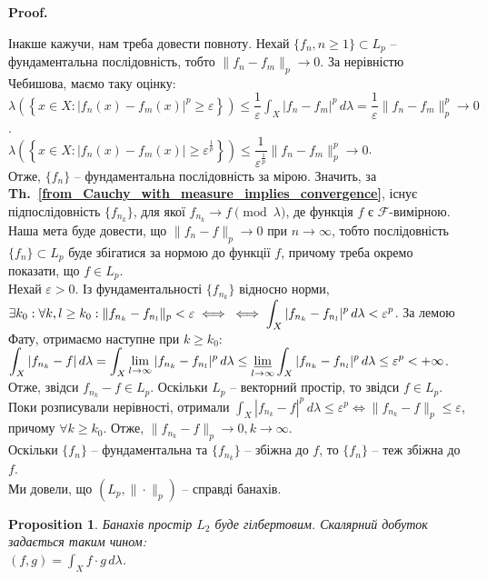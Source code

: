 \documentclass[a4paper, 10pt]{article}
\makeatletter
\theoremstyle{theoremdd}
\newtheorem{proposition}[theorem]{Proposition}
\newcommand\thref[1]{\textbf{Th.~\ref{#1}}}
\renewenvironment{proof}[1][Proof.\\]{\par
\pushQED{\hfill \qed}%
\normalfont \topsep6\p@\@plus6\p@\relax
\trivlist
\item\relax
{\bfseries
#1\@addpunct{.}}\hspace\labelsep\ignorespaces
}{%
\popQED\endtrivlist\@endpefalse
}
\makeatother
\begin{document}
\begin{proof}
Інакше кажучи, нам треба довести повноту. Нехай $\{f_n, n \geq 1\} \subset L_p$ -- фундаментальна послідовність, тобто $\|f_n - f_m\|_p \to 0$. За нерівністю Чебишова, маємо таку оцінку:\\
$\displaystyle\lambda\left(\left\{ x \in X: |f_n(x) - f_m(x)|^p \geq \varepsilon \right\}\right) \leq \dfrac{1}{\varepsilon} \int_X |f_n - f_m|^p\,d\lambda = \dfrac{1}{\varepsilon} \|f_n - f_m\|_p^p \to 0$.\\
$\displaystyle\lambda\left(\left\{ x \in X: |f_n(x) - f_m(x)| \geq \varepsilon^{\frac{1}{p}} \right\}\right) \leq \dfrac{1}{\varepsilon^{\frac{1}{p}}} \|f_n - f_m\|^p_p \to 0$.\\
Отже, $\{f_n\}$ -- фундаментальна послідовність за мірою. Значить, за \thref{from_Cauchy_with_measure_implies_convergence}, існує підпослідовність $\{f_{n_k}\}$, для якої $f_{n_k} \to f \pmod \lambda$, де функція $f$ є $\mathcal{F}$-вимірною. Наша мета буде довести, що $\|f_n - f\|_p \to 0$ при $n \to \infty$, тобто послідовність $\{f_n\} \subset L_p$ буде збігатися за нормою до функції $f$, причому треба окремо показати, що $f \in L_p$.\\
Нехай $\varepsilon > 0$. Із фундаментальності $\{f_{n_k}\}$ відносно норми, $\exists k_0: \forall k,l \geq k_0: \| f_{n_k} - f_{n_l}\|_p < \varepsilon \iff \\
\iff \displaystyle\int_X |f_{n_k} - f_{n_l}|^p\,d\lambda < \varepsilon^p$. За лемою Фату, отримаємо наступне при $k \geq k_0$:\\
$\displaystyle\int_X |f_{n_k} -f|\,d\lambda = \int_X \lim_{l \to \infty} |f_{n_k} - f_{n_l}|^p\,d\lambda \leq \varliminf_{l \to \infty} \int_X |f_{n_k} - f_{n_l}|^p\,d\lambda \leq \varepsilon^p < +\infty$.\\
Отже, звідси $f_{n_k} - f \in L_p$. Оскільки $L_p$ -- векторний простір, то звідси $f \in L_p$.\\
Поки розписували нерівності, отримали $\displaystyle\int_X |f_{n_k} - f|^p\,d\lambda \leq \varepsilon^p \iff \|f_{n_k} - f\|_p \leq \varepsilon$, причому $\forall k \geq k_0$. Отже, $\|f_{n_k} - f\|_p \to 0, k \to \infty$.\\
Оскільки $\{f_n\}$ -- фундаментальна та $\{f_{n_k}\}$ -- збіжна до $f$, то $\{f_n\}$ -- теж збіжна до $f$.\\
Ми довели, що $(L_p, \| \cdot \|_p)$ -- справді банахів.
\end{proof}

\begin{proposition}
Банахів простір $L_2$ буде гілбертовим. Скалярний добуток задається таким чином:\\
$(f,g) = \displaystyle\int_X f \cdot g\,d\lambda$.
\end{proposition}
\end{document}

